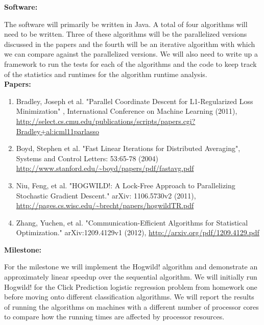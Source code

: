 \documentclass{article}
\begin{document}
		
\textbf{Software:}

	The software will primarily be written in Java.  A total of four algorithms will need to be written.  Three of these 
algorithms will be the parallelized versions discussed in the papers and the fourth will be an iterative algorithm with which 
we can compare against the parallelized versions. We will also need to write up a framework to run the tests for each of the 
algorithms and the code to keep track of the statistics and runtimes for the algorithm runtime analysis. \\
\textbf{Papers:}
	\begin{enumerate}
		\item Bradley, Joseph et al. "Parallel Coordinate Descent for L1-Regularized Loss Minimization" , International 
Conference on Machine Learning (2011), 
			\url{http://select.cs.cmu.edu/publications/scripts/papers.cgi?Bradley+al:icml11parlasso}
		\item Boyd, Stephen et al. "Fast Linear Iterations for Distributed Averaging", Systems and Control Letters:
53:65-78 (2004)
			\url{http://www.stanford.edu/~boyd/papers/pdf/fastavg.pdf}
		\item Niu, Feng, et al. "HOGWILD!: A Lock-Free Approach to Parallelizing Stochastic Gradient Descent." arXiv:
1106.5730v2 (2011), 
			\url{http://pages.cs.wisc.edu/~brecht/papers/hogwildTR.pdf}	
		\item Zhang, Yuchen, et al. "Communication-Efficient Algorithms for Statistical Optimization." arXiv:1209.4129v1 
(2012), 
			\url{http://arxiv.org/pdf/1209.4129.pdf}
	\end{enumerate}
\textbf{Milestone:}

For the milestone we will implement the Hogwild! algorithm and demonstrate an approximately linear speedup over the 
sequential algorithm.  We will initially run Hogwild! for the Click Prediction logistic regression problem from homework one 
before moving onto different classification algorithms. We will report the results of running the algorithms on machines with 
a different number of processor cores to compare how the running times are affected by processor resources.
\end{document}
